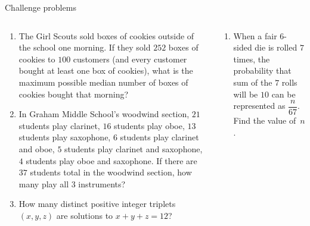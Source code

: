 \documentclass[9pt,aspectratio=169]{beamer}
\begin{document}
\begin{frame}{Challenge problems}
  \begin{columns}[T]
    \begin{column}{0.5\textwidth}
      \begin{enumerate}
        \item The Girl Scouts sold boxes of cookies outside of the school one morning.  If they sold $252$ boxes of cookies to $100$ customers (and every customer bought at least one box of cookies), what is the maximum possible median number of boxes of cookies bought that morning?
        \item In Graham Middle School's woodwind section, $21$ students play clarinet, $16$ students play oboe, $13$ students play saxophone, $6$ students play clarinet and oboe, $5$ students play clarinet and saxophone, $4$ students play oboe and saxophone.  If there are $37$ students total in the woodwind section, how many play all $3$ instruments?
        \item How many distinct positive integer triplets $(x, y, z)$ are solutions to $x + y + z = 12$?
        \seti
      \end{enumerate}
    \end{column}
    \begin{column}{0.5\textwidth}
      \begin{enumerate}
        \conti
        \item When a fair $6$-sided die is rolled $7$ times, the probability that sum of the $7$ rolls will be $10$ can be represented as $\dfrac{n}{67}$.  Find the value of~$n$.
      \end{enumerate}
    \end{column}
  \end{columns}
\end{frame}

\end{document}
